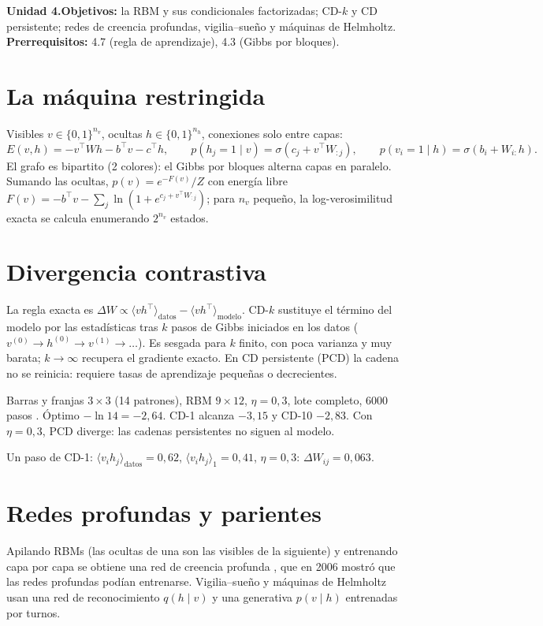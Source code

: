 \documentclass[11pt,a4paper]{article}
\begin{document}

\noindent\textbf{Unidad 4.}\quad\textbf{Objetivos:} la RBM y sus condicionales factorizadas; CD-$k$ y CD persistente; redes de creencia profundas,
vigilia--sueño y máquinas de Helmholtz.
\textbf{Prerrequisitos:} 4.7 (regla de aprendizaje), 4.3 (Gibbs por bloques).

\section{La máquina restringida}
Visibles $v\in\{0,1\}^{n_v}$, ocultas $h\in\{0,1\}^{n_h}$, conexiones solo entre capas:
\begin{equation}
E(v,h)=-v^\top Wh-b^\top v-c^\top h,\qquad p(h_j=1\mid v)=\sigma(c_j+v^\top W_{:j}),\qquad p(v_i=1\mid h)=\sigma(b_i+W_{i:}h).
\end{equation}
El grafo es bipartito (2 colores): el Gibbs por bloques alterna capas en paralelo. Sumando las ocultas, $p(v)=e^{-F(v)}/Z$ con energía libre
$F(v)=-b^\top v-\sum_j\ln(1+e^{c_j+v^\top W_{:j}})$; para $n_v$ pequeño, la log-verosimilitud exacta se calcula enumerando $2^{n_v}$ estados.

\section{Divergencia contrastiva}
La regla exacta es $\Delta W\propto\langle vh^\top\rangle_{\text{datos}}-\langle vh^\top\rangle_{\text{modelo}}$. CD-$k$ \cite{cd} sustituye el término del modelo por
las estadísticas tras $k$ pasos de Gibbs iniciados en los datos ($v^{(0)}\to h^{(0)}\to v^{(1)}\to\dots$). Es sesgada para $k$ finito, con poca
varianza y muy barata; $k\to\infty$ recupera el gradiente exacto. En CD persistente (PCD) la cadena no se reinicia: requiere tasas de aprendizaje
pequeñas o decrecientes.
\begin{ejemplo}
Barras y franjas $3\times3$ (14 patrones), RBM $9\times12$, $\eta=0{,}3$, lote completo, 6000 pasos \evS. Óptimo $-\ln14=-2{,}64$.
CD-1 alcanza $-3{,}15$ y CD-10 $-2{,}83$. Con $\eta=0{,}3$, PCD diverge: las cadenas persistentes no siguen al modelo.
\end{ejemplo}
\begin{ejemplo}
Un paso de CD-1: $\langle v_ih_j\rangle_{\text{datos}}=0{,}62$, $\langle v_ih_j\rangle_1=0{,}41$, $\eta=0{,}3$: $\Delta W_{ij}=0{,}063$.
\end{ejemplo}

\section{Redes profundas y parientes}
Apilando RBMs (las ocultas de una son las visibles de la siguiente) y entrenando capa por capa se obtiene una red de creencia profunda \cite{dbn},
que en 2006 mostró que las redes profundas podían entrenarse. Vigilia--sueño y máquinas de Helmholtz usan una red de reconocimiento $q(h\mid v)$ y
una generativa $p(v\mid h)$ entrenadas por turnos.
\end{document}
